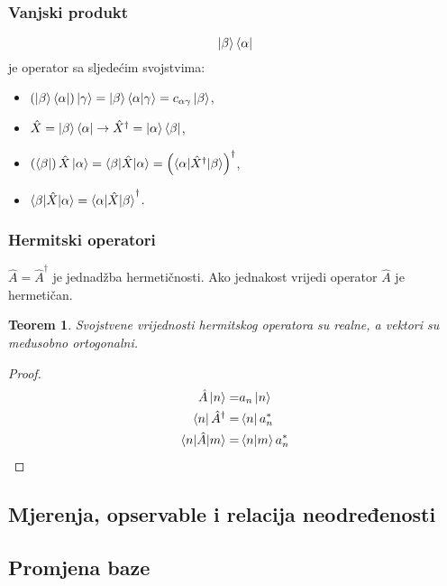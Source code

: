 \documentclass{article}
\newtheorem{theorem}{Teorem}[section]
\newtheorem{proof}{Dokaz}[section]
\numberwithin{equation}{section}
\begin{document}
\subsubsection{Vanjski produkt}
\begin{equation}
	\ket{\beta}\bra{\alpha}
\end{equation}
je operator sa sljedećim svojstvima:
\begin{itemize}
	\item $\left(\ket{\beta}\bra{\alpha}\right)\ket{\gamma} = \ket{\beta}\braket{\alpha|\gamma} = c_{\alpha\gamma}\ket{\beta}$,
	\item $\hat{X} = \ket{\beta}\bra{\alpha} \rightarrow \hat{X}^{\dagger} = \ket{\alpha}\bra{\beta}$,
	\item $\left(\bra{\beta}\right)\hat{X}\ket{\alpha} = \braket{\beta|\hat{X}|\alpha} = \left(\braket{\alpha|\hat{X}^{\dagger}|\beta}\right)^{\dagger}$,
	\item $\braket{\beta|\hat{X}|\alpha} = \braket{\alpha|\hat{X}|\beta}^{\dagger}$.
\end{itemize}
\subsubsection{Hermitski operatori}
 $\hat{A} = \hat{A}^{\dagger}$ je jednadžba hermetičnosti. Ako jednakost vrijedi operator $\hat{A}$ je hermetičan.
 \begin{theorem}
	 Svojstvene vrijednosti hermitskog operatora su realne, a vektori su međusobno ortogonalni.
 \end{theorem}
\begin{proof}
	\begin{equation}
		\begin{align}
			\hat{A}\ket{n}=& a_n\ket{n}\\
			\bra{n}\hat{A}^{\dagger} =& \bra{n}a_n^*\\
			\braket{n|\hat{A}|m} =& \braket{n|m}a_n^*
		\end{align}
	\end{equation}
\end{proof}



\subsection{Mjerenja, opservable i relacija neodređenosti}

\subsection{Promjena baze}
\end{document}
